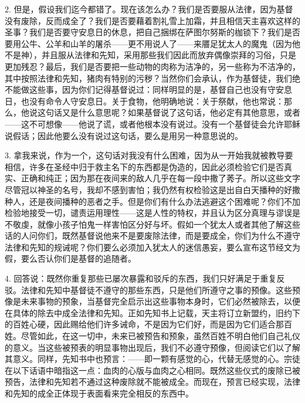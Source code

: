 2. 但是，假设我们迄今都错了。现在该怎么办？我们是否要服从法律，因为基督没有废除，反而成全了？我们是否要藉着割礼雪上加霜，并且相信天主喜欢这样的圣事？我们是否要守安息日的休息，把自己捆绑在萨图尔努斯的枷锁下？我们是否要用公牛、公羊和山羊的屠杀——更不用说人了——来餍足犹太人的魔鬼（因为他不是神），并且服从法律和先知，采用那些我们因此而放弃偶像崇拜的习俗，只是更加残忍？最后，我们是否要把一些动物的肉称为洁净的，另一些称为不洁净的，其中按照法律和先知，猪肉有特别的污秽？当然你们会承认，作为基督徒，我们绝不能做这些事，因为你们记得基督说过：同样明显的是，基督自己也没有守安息日，也没有命令人守安息日。关于食物，他明确地说：关于祭献，他也常说：那么，他说这句话又是什么意思呢？如果基督说了这句话，他必定有其他意思，或者——这不可想像——他说了谎，或者他根本没有说过。没有一个基督徒会允许耶稣说假话；因此他要么没有说过这句话，要么是用另一种意思说的。\par

3. 拿我来说，作为一个，这句话对我没有什么困难，因为从一开始我就被教导要相信，许多在圣经中归于救主名下的东西都是伪造的，因此必须检验它们是否真实、正确和纯正；因为那在夜间来的敌人几乎在每一段中撒了莠子。所以这些文字尽管冠以神圣的名号，我却不感到害怕；我仍然有权检验这是出自白天播种的好撒种人，还是夜间播种的恶者之手。但是你们有什么办法逃避这个困难呢？你们不加检验地接受一切，谴责运用理性——这是人性的特权，并且认为区分真理与谬误是不敬虔，就像小孩子怕鬼一样害怕区分好与坏。假如一个犹太人或者其他了解这些话的人问你们，既然基督说他来不是要废除法律，而是要成全，你们为什么不遵守法律和先知的规诫呢？你们要么必须加入犹太人的迷信愚妄，要么宣布这节经文为假，要么否认你们是基督的追随者。\par

4. 回答说：既然你重复那些已屡次暴露和驳斥的东西，我们只好满足于重复反驳。法律和先知中基督徒不遵守的那些东西，只是他们所遵守之事的预像。这些预像是未来事物的预象，当基督完全启示出这些事物本身时，它们必然被除去，以便在具体的除去中成全法律和先知。正如先知书上记载，天主将订立新盟约，旧约下的百姓心硬，因此赐给他们许多诫命，不是因为它们好，而是因为它们适合那百姓。尽管如此，在这一切中，未来已被预告和预象，虽然百姓不明白他们自己礼仪的意义。当这些被预表的明显事物出现后，我们不必遵守预像，但阅读它们以了解其意义。同样，先知书中也预言：——即一颗有感觉的心，代替无感觉的心。宗徒在以下话语中暗指这一点：血肉的心版与血肉之心相同。既然这些仪式的废除已被预告，法律和先知若不通过这种废除就不能被成全。而现在，预言已经实现，法律和先知的成全正体现于表面看来完全相反的东西中。\par


